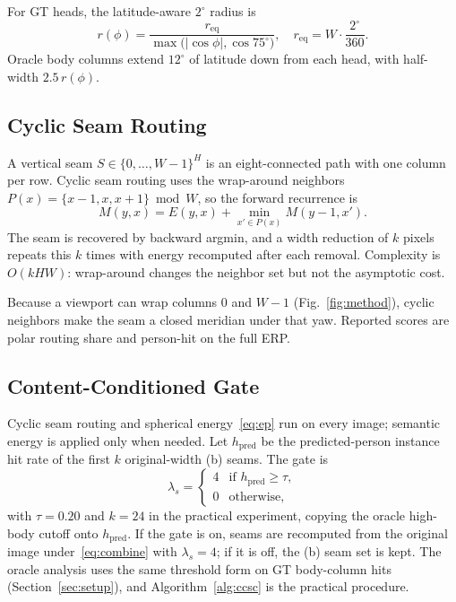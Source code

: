 For GT heads, the latitude-aware $2^\circ$ radius is
\begin{equation}
\label{eq:rphi}
r(\phi)=\frac{r_{\mathrm{eq}}}{\max\bigl(|\cos\phi|,\cos 75^\circ\bigr)},
\quad
r_{\mathrm{eq}}=W\cdot\frac{2^\circ}{360}.
\end{equation}
Oracle body columns extend $12^\circ$ of latitude down from each
head, with half-width $2.5\,r(\phi)$.

\subsection{Cyclic Seam Routing}
\label{sec:cyclic}

A vertical seam $S\in\{0,\ldots,W-1\}^H$ is an eight-connected
path with one column per row. Cyclic seam routing uses the
wrap-around neighbors $P(x)=\{x-1,x,x+1\}\bmod W$, so the
forward recurrence is
\begin{equation}
\label{eq:dp}
M(y,x)=E(y,x)+\min_{x'\in P(x)} M(y-1,x').
\end{equation}
The seam is recovered by backward argmin, and a width reduction
of $k$ pixels repeats this $k$ times with energy recomputed after
each removal. Complexity is $O(kHW)$: wrap-around changes the
neighbor set but not the asymptotic cost.

Because a viewport can wrap columns $0$ and $W-1$
(Fig.~\ref{fig:method}), cyclic neighbors make the seam a closed
meridian under that yaw. Reported scores are polar routing share
and person-hit on the full ERP.

\subsection{Content-Conditioned Gate}
\label{sec:gate}

Cyclic seam routing and spherical energy~\eqref{eq:ep} run on
every image; semantic energy is applied only when needed. Let
$h_{\mathrm{pred}}$ be the predicted-person instance hit rate of
the first $k$ original-width (b) seams. The gate is
\begin{equation}
\label{eq:gate}
\lambda_s=
\begin{cases}
4 & \text{if }h_{\mathrm{pred}}\ge\tau,\\
0 & \text{otherwise,}
\end{cases}
\end{equation}
with $\tau=0.20$ and $k=24$ in the practical experiment, copying
the oracle high-body cutoff onto $h_{\mathrm{pred}}$. If the gate
is on, seams are recomputed from the original image
under~\eqref{eq:combine} with $\lambda_s=4$; if it is off, the
(b) seam set is kept. The oracle analysis uses the same
threshold form on GT body-column hits (Section~\ref{sec:setup}),
and Algorithm~\ref{alg:ccsc} is the practical procedure.

